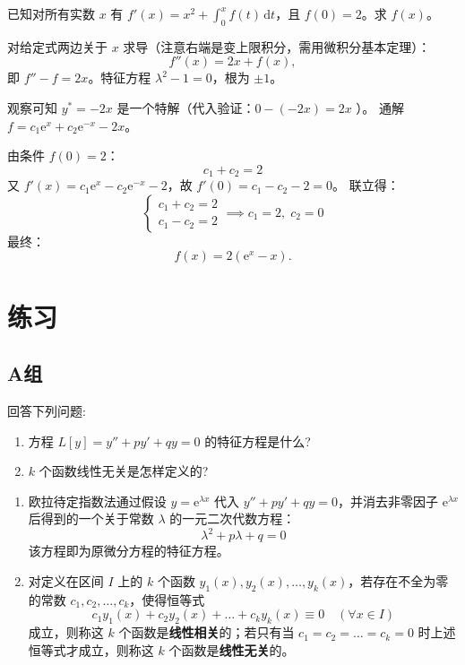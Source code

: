 \documentclass[lang=cn,11pt]{elegantbook}
\begin{document}
\begin{exercise}[积分方程转化为微分方程]
已知对所有实数 $x$ 有
$f'(x)=x^2+\displaystyle\int_0^x f(t)\,\mathrm{d}t$，且 $f(0)=2$。求 $f(x)$。
\end{exercise}
\begin{solution}
对给定式两边关于 $x$ 求导（注意右端是变上限积分，需用微积分基本定理）：
\[
f''(x)=2x+f(x),
\]
即 $f''-f=2x$。特征方程 $\lambda^2-1=0$，根为 $\pm 1$。

观察可知 $y^*=-2x$ 是一个特解（代入验证：$0-(-2x)=2x$ ）。
通解 $f=c_1\mathrm{e}^x+c_2\mathrm{e}^{-x}-2x$。

由条件 $f(0)=2$：
\[
c_1+c_2=2
\]
又 $f'(x)=c_1\mathrm{e}^x-c_2\mathrm{e}^{-x}-2$，故 $f'(0)=c_1-c_2-2=0$。
联立得：
\[
\begin{cases}
c_1 + c_2 = 2 \\
c_1 - c_2 = 2
\end{cases}
\implies c_1=2,\;c_2=0
\]
最终：
\[
\boxed{f(x)=2(\mathrm{e}^x-x)}.
\]
\end{solution}


\section{练习}

\subsection{A组}

\begin{exercise}[基本概念]
回答下列问题:
\begin{enumerate}
    \item[(1)] 方程 $L[y]=y''+py'+qy=0$ 的特征方程是什么?
    \item[(2)] $k$ 个函数线性无关是怎样定义的?
\end{enumerate}
\end{exercise}
\begin{solution}
\begin{enumerate}
    \item[(1)] 欧拉待定指数法通过假设 $y=\mathrm{e}^{\lambda x}$ 代入 $y''+py'+qy=0$，并消去非零因子 $\mathrm{e}^{\lambda x}$ 后得到的一个关于常数 $\lambda$ 的一元二次代数方程：
    \[
    \lambda^2 + p\lambda + q = 0
    \]
    该方程即为原微分方程的特征方程。
    
    \item[(2)] 对定义在区间 $I$ 上的 $k$ 个函数 $y_1(x), y_2(x), \dots, y_k(x)$，若存在不全为零的常数 $c_1, c_2, \dots, c_k$，使得恒等式
    \[
    c_1y_1(x) + c_2y_2(x) + \dots + c_ky_k(x) \equiv 0 \quad (\forall x \in I)
    \]
    成立，则称这 $k$ 个函数是\textbf{线性相关}的；若只有当 $c_1 = c_2 = \dots = c_k = 0$ 时上述恒等式才成立，则称这 $k$ 个函数是\textbf{线性无关}的。
\end{enumerate}
\end{solution}
\end{document}
